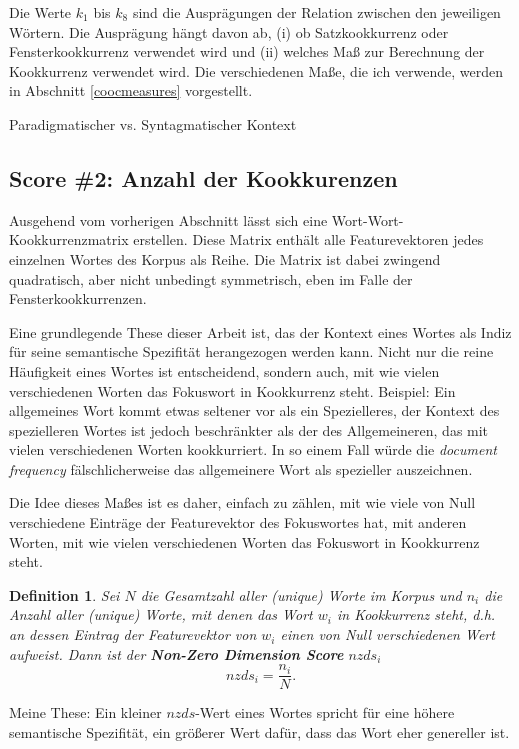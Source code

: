 \documentclass[11pt,numbers=noenddot]{scrartcl}
\newtheorem*{defi}{Definition}
\begin{document}
Die Werte $k_1$ bis $k_8$ sind die Ausprägungen der Relation zwischen den jeweiligen Wörtern. Die Ausprägung hängt davon ab, (i) ob Satzkookkurrenz oder Fensterkookkurrenz verwendet wird und (ii) welches Maß zur Berechnung der Kookkurrenz verwendet wird. Die verschiedenen Maße, die ich verwende, werden in Abschnitt \ref{coocmeasures} vorgestellt.

Paradigmatischer vs. Syntagmatischer Kontext

\subsection{Score \#2: Anzahl der Kookkurenzen}

Ausgehend vom vorherigen Abschnitt lässt sich eine Wort-Wort-Kookkurrenzmatrix erstellen. Diese Matrix enthält alle Featurevektoren jedes einzelnen Wortes des Korpus als Reihe. Die Matrix ist dabei zwingend quadratisch, aber nicht unbedingt symmetrisch, eben im Falle der Fensterkookkurrenzen.

Eine grundlegende These dieser Arbeit ist, das der Kontext eines Wortes als Indiz für seine semantische Spezifität herangezogen werden kann. Nicht nur die reine Häufigkeit eines Wortes ist entscheidend, sondern auch, mit wie vielen verschiedenen Worten das Fokuswort in Kookkurrenz steht. Beispiel: Ein allgemeines Wort kommt etwas seltener vor als ein Spezielleres, der Kontext des spezielleren Wortes ist jedoch beschränkter als der des Allgemeineren, das mit vielen verschiedenen Worten kookkurriert. In so einem Fall würde die \emph{document frequency} fälschlicherweise das allgemeinere Wort als spezieller auszeichnen.

Die Idee dieses Maßes ist es daher, einfach zu zählen, mit wie viele von Null verschiedene Einträge der Featurevektor des Fokuswortes hat, mit anderen Worten, mit wie vielen verschiedenen Worten das Fokuswort in Kookkurrenz steht.

\begin{defi}
Sei $N$ die Gesamtzahl aller (unique) Worte im Korpus und $n_i$ die Anzahl aller (unique) Worte, mit denen das Wort $w_i$ in Kookkurrenz steht, d.h. an dessen Eintrag der Featurevektor von $w_i$ einen von Null verschiedenen Wert aufweist. Dann ist der \textbf{Non-Zero Dimension Score} $nzds_i$
\begin{equation}
    nzds_i = \frac{n_i}{N}.
\end{equation}
\end{defi}

Meine These: Ein kleiner $nzds$-Wert eines Wortes spricht für eine höhere semantische Spezifität, ein größerer Wert dafür, dass das Wort eher genereller ist.
\end{document}
